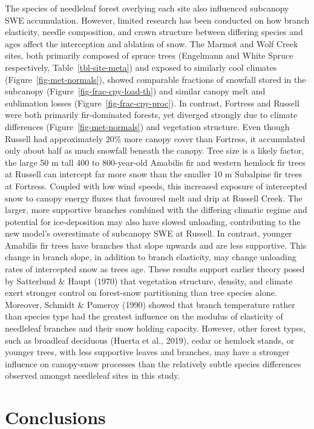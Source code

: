 \documentclass[
  letterpaper,
]{tex/uofsthesis-cs}
\begin{document}
The species of needleleaf forest overlying each site also influenced
subcanopy SWE accumulation. However, limited research has been conducted
on how branch elasticity, needle composition, and crown structure
between differing species and ages affect the interception and ablation
of snow. The Marmot and Wolf Creek sites, both primarily composed of
spruce trees (Engelmann and White Spruce respectively,
Table~\ref{tbl-site-meta}) and exposed to similarly cool climates
(Figure~\ref{fig-met-normals}), showed comparable fractions of snowfall
stored in the subcanopy (Figure~\ref{fig-frac-cpy-load-th}) and similar
canopy melt and sublimation losses (Figure~\ref{fig-frac-cpy-proc}). In
contrast, Fortress and Russell were both primarily fir-dominated
forests, yet diverged strongly due to climate differences
(Figure~\ref{fig-met-normals}) and vegetation structure. Even though
Russell had approximately 20\% more canopy cover than Fortress, it
accumulated only about half as much snowfall beneath the canopy. Tree
size is a likely factor, the large 50 m tall 400 to 800-year-old
Amabilis fir and western hemlock fir trees at Russell can intercept far
more snow than the smaller 10 m Subalpine fir trees at Fortress. Coupled
with low wind speeds, this increased exposure of intercepted snow to
canopy energy fluxes that favoured melt and drip at Russell Creek. The
larger, more supportive branches combined with the differing climatic
regime and potential for ice-deposition may also have slowed unloading,
contributing to the new model's overestimate of subcanopy SWE at
Russell. In contrast, younger Amabilis fir trees have branches that
slope upwards and are less supportive. This change in branch slope, in
addition to branch elasticity, may change unloading rates of intercepted
snow as trees age. These results support earlier theory posed by
Satterlund \& Haupt (1970) that vegetation structure, density, and
climate exert stronger control on forest-snow partitioning than tree
species alone. Moreover, Schmidt \& Pomeroy (1990) showed that branch
temperature rather than species type had the greatest influence on the
modulus of elasticity of needleleaf branches and their snow holding
capacity. However, other forest types, such as broadleaf deciduous
(Huerta et al., 2019), cedar or hemlock stands, or younger trees, with
less supportive leaves and branches, may have a stronger influence on
canopy-snow processes than the relatively subtle species differences
observed amongst needleleaf sites in this study.

\section{Conclusions}\label{conclusions-3}
\end{document}
